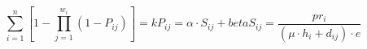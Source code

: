 \documentclass[UTF8,a4paper]{ctexart}
\begin{document}
    \begin{equation}
\sum_{i=1}^{n} \left[ 1-\prod_{j=1}^{w_i} (1-P_{ij}) \right] = k 
P_{ij}= \alpha \cdot S_{ij} + beta
S_{ij} = \frac{pr_{i}}{(\mu \cdot h_{i}+ d_{ij})\cdot e}
\end{equation}
\end{document}
